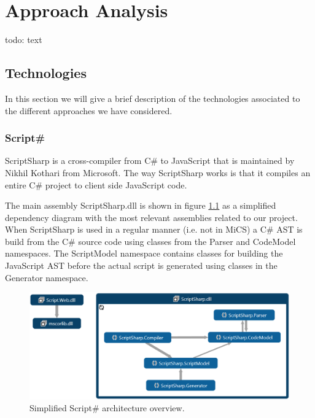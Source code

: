 \chapter{Approach Analysis}
	todo: text

\section{Technologies}
	In this section we will give a brief description of the technologies associated to the different approaches we have considered.

	\subsection{Script\#} %
	\label{sub:subsection_name}
		ScriptSharp \cite{scriptsharp} is a cross-compiler from C\# to JavaScript that is maintained by Nikhil Kothari \cite{nikhilk} from Microsoft. The way ScriptSharp works is that it compiles an entire C\# project to client side JavaScript code.

		The main assembly ScriptSharp.dll is shown in figure \ref{simplifiedOverview} as a simplified dependency diagram with the most relevant assemblies related to our project. When ScriptSharp is used in a regular manner (i.e. not in MiCS) a C\# AST is build from the C\# source code using classes from the Parser and CodeModel namespaces. The ScriptModel namespace contains classes for building the JavaScript AST before the actual script is generated using classes in the Generator namespace.

				\begin{figure}[H]
			\begin{center}
				\centerline{\includegraphics[width=16cm]{resources/images/SimplifiedOverview.png}}
			\end{center}
			\caption{Simplified Script\# architecture overview.}
			\label{simplifiedOverview}
		\end{figure}

